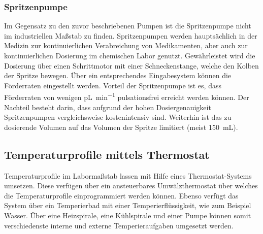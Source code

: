 \subsubsection*{Spritzenpumpe}
Im Gegensatz zu den zuvor beschriebenen Pumpen ist die Spritzenpumpe nicht im industriellen Maßstab zu finden. Spritzenpumpen werden hauptsächlich in der Medizin zur kontinuierlichen Verabreichung von Medikamenten, aber auch zur kontinuierlichen Dosierung im chemischen Labor genutzt. Gewährleistet wird die Dosierung über einen Schrittmotor mit einer Schneckenstange, welche den Kolben der Spritze bewegen. Über ein entsprechendes Eingabesystem können die Förderraten eingestellt werden. Vorteil der Spritzenpumpe ist es, dass Förderraten von wenigen \si{\pico \liter \per \minute} pulsationsfrei erreicht werden können. 
\newpage
Der Nachteil besteht darin, dass aufgrund der hohen Dosiergenauigkeit Spritzenpumpen vergleichsweise kostenintensiv sind. Weiterhin ist das zu dosierende Volumen auf das Volumen der Spritze limitiert (meist \SI{150}{\milli \liter}). \cite{Wikipedia.2020,legato_spritzenpumpe}

\subsection{Temperaturprofile mittels Thermostat}
Temperaturprofile im Labormaßstab lassen mit Hilfe eines Thermostat-Systems umsetzen. Diese verfügen über ein ansteuerbares Umwälzthermostat über welches die Temperaturprofile einprogrammiert werden können. Ebenso verfügt das System über ein  Temperierbad mit einer Temperierflüssigkeit, wie zum Beispiel Wasser. Über eine Heizspirale, eine Kühlspirale und einer Pumpe können somit verschiedenste interne und externe Temperieraufgaben umgesetzt werden.
